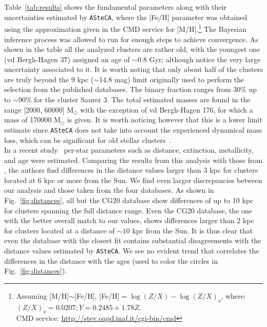 \documentclass[draft]{aa}
\begin{document}
  Table~\ref{tab:results} shows the fundamental parameters along with their
  uncertainties estimated by \texttt{ASteCA}, where the [Fe/H] parameter was
  obtained using the approximation given in the CMD service for
  [M/H].\footnote{Assuming [M/H]$\sim$[Fe/H], [Fe/H]$=\log(Z/X)-\log(Z/X)_{o}$, where:
  $(Z/X)_{o}=0.0207; Y=0.2485+1.78Z$.\\
  CMD service: \url{http://stev.oapd.inaf.it/cgi-bin/cmd}}
  The Bayesian inference process was allowed to run for enough steps to achieve
  convergence.
  As shown in the table all the analyzed clusters are rather old, with the
  youngest one (vd Bergh-Hagen 37) assigned an age of $\sim0.8$ Gyr; although
  notice the very large uncertainty associated to it. It is worth noting
  that only about half of the clusters are truly beyond the 9 kpc ($\sim$14.8
  mag) limit originally used to perform the selection from the published
  databases. The binary fraction ranges from 30\% up to $\sim90$\% for the
  cluster Saurer 3. The total estimated masses are found in the range [2000,
  60000] M$_{\odot}$ with the exception of vd Bergh-Hagen 176, for which a mass
  of 170000 M$_{\odot}$ is given. It is worth noticing however that this is a
  lower limit estimate since \texttt{ASteCA} does not take into account the
  experienced dynamical mass loss, which can be significant for old stellar
  clusters~\citep{Martinez_2017}.\\

  In a recent study~\citep{Anders_2021} per-star parameters such as distance,
  extinction, metallicity, and age were estimated. Comparing the results
  from this analysis with those from \cite{Cantat_2020}, the authors find
  differences in the distance values larger than 3 kpc for clusters located at
  6 kpc or more from the Sun. We find even larger discrepancies between our
  analysis and those taken from the four databases. As shown in
  Fig.~\ref{fig:distances}, all but the CG20 database show differences of up
  to 10 kpc for clusters spanning the full distance range. Even the CG20
  database, the one with the better overall match to our values, shows
  differences larger than 2 kpc for clusters located at a distance of $\sim10$
  kpc from the Sun. It is thus clear that even the database with the closest fit
  contains substantial disagreements with the distance values estimated by 
  \texttt{ASteCA}. We see no evident trend that correlates the differences in
  the distance with the ages (used to color the circles in
  Fig.~\ref{fig:distances}).\\
\end{document}

